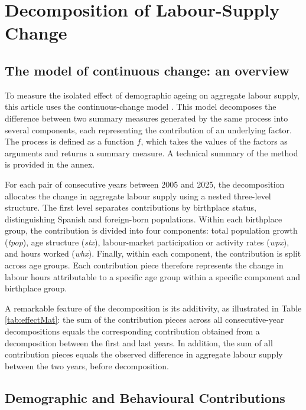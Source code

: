 \section{Decomposition of Labour-Supply Change}

\subsection{The model of continuous change: an overview}

To measure the isolated effect of demographic ageing on aggregate labour supply, this article uses the continuous-change model \citep{horiuchiDecompositionMethodBased2008}. This model decomposes the difference between two summary measures generated by the same process into several components, each representing the contribution of an underlying factor. The process is defined as a function \(f\), which takes the values of the factors as arguments and returns a summary measure. A technical summary of the method is provided in the annex.

For each pair of consecutive years between 2005 and 2025, the decomposition allocates the change in aggregate labour supply using a nested three-level structure. The first level separates contributions by birthplace status, distinguishing Spanish and foreign-born populations. Within each birthplace group, the contribution is divided into four components: total population growth (\textit{tpop}), age structure (\textit{stx}), labour-market participation or activity rates (\textit{wpx}), and hours worked (\textit{whx}). Finally, within each component, the contribution is split across age groups. Each contribution piece therefore represents the change in labour hours attributable to a specific age group within a specific component and birthplace group.

A remarkable feature of the decomposition is its additivity, as illustrated in Table \ref{tab:effectMat}: the sum of the contribution pieces across all consecutive-year decompositions equals the corresponding contribution obtained from a decomposition between the first and last years. In addition, the sum of all contribution pieces equals the observed difference in aggregate labour supply between the two years, before decomposition.



\subsection{Demographic and Behavioural Contributions}

